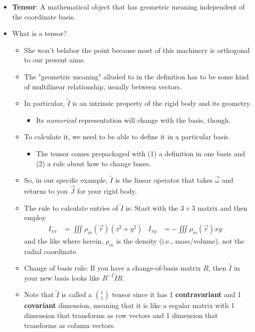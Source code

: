 \documentclass[../notes.tex]{subfiles}
\begin{document}
\begin{itemize}
    \item \textbf{Tensor}: A mathematical object that has geometric meaning independent of the coordinate basis.
    \item What is a tensor?
    \begin{itemize}
        \item She won't belabor the point because most of this machinery is orthogonal to our present aims.
        \item The "geometric meaning" alluded to in the definition has to be some kind of multilinear relationship, usually between vectors.
        \item In particular, $\overleftrightarrow{I}$ is an intrinsic property of the rigid body and its geometry.
        \begin{itemize}
            \item Its \emph{numerical} representation will change with the basis, though.
        \end{itemize}
        \item To calculate it, we need to be able to define it in a particular basis.
        \begin{itemize}
            \item The tensor comes prepackaged with (1) a definition in one basis and (2) a rule about how to change bases.
        \end{itemize}
        \item So, in our specific example, $\overleftrightarrow{I}$ is the linear operator that takes $\vec{\omega}$ and returns to you $\vec{J}$ for your rigid body.
        \item The rule to calculate entries of $\overleftrightarrow{I}$ is: Start with the $3\times 3$ matrix and then employ
        \begin{align*}
            I_{xx} &= \iiint\rho_m(\vec{r})(z^2+y^2)&
            I_{xy} &= -\iiint\rho_m(\vec{r})xy&
        \end{align*}
        and the like where herein, $\rho_m$ is the density (i.e., mass/volume), not the radial coordinate.
        \item Change of basis rule: If you have a change-of-basis matrix $R$, then $\overleftrightarrow{I}$ in your new basis looks like $R^{-1}\overleftrightarrow{I}R$.
        \item Note that $\overleftrightarrow{I}$ is called a $\binom{1}{1}$ tensor since it has 1 \textbf{contravariant} and 1 \textbf{covariant} dimension, meaning that it is like a regular matrix with 1 dimension that transforms as row vectors and 1 dimension that transforms as column vectors.

\end{itemize}
\end{itemize}
\end{document}
